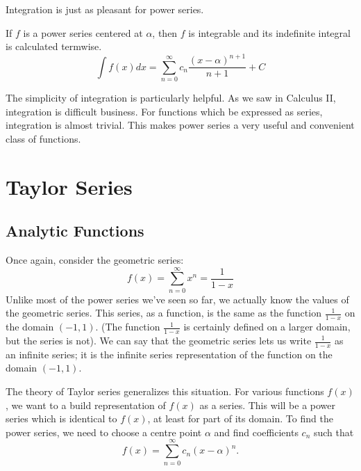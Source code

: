 \documentclass[fleqn,letterpaper]{report}
\begin{document}
Integration is just as pleasant for power series.

\begin{prop}
If $f$ is a power series centered at $\alpha$, then $f$ is
integrable and its indefinite integral is calculated termwise.
\begin{equation*}
\int f(x) dx= \sum_{n=0}^\infty c_n \frac{(x-\alpha)^{n+1}}{n+1} + C
\end{equation*}
\end{prop}

The simplicity of integration is particularly helpful. As we
saw in Calculus II, integration is difficult business. For
functions which be expressed as series, integration is almost
trivial. This makes power series a very useful and convenient
class of functions.

\section{Taylor Series}
\label{taylor-series-definition}

\subsection{Analytic Functions}
\label{analytic-functions}

Once again, consider the geometric series:
\begin{equation*}
f(x) = \sum_{n=0}^\infty x^n = \frac{1}{1-x} 
\end{equation*}
Unlike most of the power series we've seen so far, we actually
know the values of the geometric series. This series, as a
function, is the same as the function $\frac{1}{1-x}$ on the
domain $(-1,1)$. (The function $\frac{1}{1-x}$ is certainly
defined on a larger domain, but the series is not). We can
say that the geometric series lets us write $\frac{1}{1-x}$ as
an infinite series; it is the infinite series representation
of the function on the domain $(-1,1)$. 

The theory of Taylor series generalizes this situation. For
various functions $f(x)$, we want to a build representation of
$f(x)$ as a series. This will be a power series which is identical to
$f(x)$, at least for part of its domain. To find the power
series, we need to choose a centre point $\alpha$ and find
coefficients $c_n$ such that
\begin{equation*}
f(x) = \sum_{n=0}^\infty c_n (x-\alpha)^n.
\end{equation*}
\end{document}
